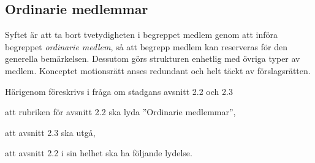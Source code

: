 \documentclass{article}
\begin{document}
\subsection{Ordinarie medlemmar}
Syftet är att ta bort tvetydigheten i begreppet medlem genom att införa
begreppet \emph{ordinarie medlem}, så att begrepp medlem kan reserveras för den
generella bemärkelsen.
Dessutom görs strukturen enhetlig med övriga typer av medlem.
Konceptet motionsrätt anses redundant och helt täckt av förslagsrätten.

Härigenom föreskrivs i fråga om stadgans avsnitt 2.2 och 2.3
\begin{dels}
    \item att rubriken för avsnitt 2.2 ska lyda ''Ordinarie medlemmar'',
    \item att avsnitt 2.3 ska utgå,
    \item att avsnitt 2.2 i sin helhet ska ha följande lydelse.
\end{dels}
\end{document}
